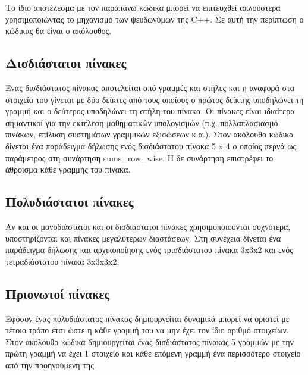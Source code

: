 



Το ίδιο αποτέλεσμα με τον παραπάνω κώδικα μπορεί να επιτευχθεί απλούστερα χρησιμοποιώντας το μηχανισμό των ψευδωνύμων της C++. Σε αυτή την περίπτωση ο κώδικας θα είναι ο ακόλουθος.




\subsection{Δισδιάστατοι πίνακες}
Ένας δισδιάστατος πίνακας αποτελείται από γραμμές και στήλες και η αναφορά στα στοιχεία του γίνεται με δύο  δείκτες από τους οποίους ο πρώτος δείκτης υποδηλώνει τη γραμμή και ο δεύτερος υποδηλώνει τη στήλη του πίνακα. Οι πίνακες είναι ιδιαίτερα σημαντικοί για την εκτέλεση μαθηματικών υπολογισμών (π.χ. πολλαπλασιασμό πινάκων, επίλυση συστημάτων γραμμικών εξισώσεων κ.α.). Στον ακόλουθο κώδικα δίνεται ένα παράδειγμα δήλωσης ενός δισδιάστατου πίνακα 5 x 4 ο οποίος περνά ως παράμετρος στη συνάρτηση sums\_row\_wise. Η δε συνάρτηση επιστρέφει το άθροισμα κάθε γραμμής του πίνακα.






\subsection{Πολυδιάστατοι πίνακες}
Αν και οι μονοδιάστατοι και οι δισδιάστατοι πίνακες χρησιμοποιούνται συχνότερα, υποστηρίζονται και πίνακες μεγαλύτερων διαστάσεων. Στη συνέχεια δίνεται ένα παράδειγμα δήλωσης και αρχικοποίησης ενός τρισδιάστατου πίνακα 3x3x2 και ενός τετραδιάστατου πίνακα 3x3x3x2.




\subsection{Πριονωτοί πίνακες}
Εφόσον ένας πολυδιάστατος πίνακας δημιουργείται δυναμικά μπορεί να οριστεί με τέτοιο τρόπο έτσι ώστε η κάθε γραμμή του να μην έχει τον ίδιο αριθμό στοιχείων. Στον ακόλουθο κώδικα δημιουργείται ένας δισδιάστατος πίνακας 5 γραμμών με την πρώτη γραμμή να έχει 1 στοιχείο και κάθε επόμενη γραμμή ένα περισσότερο στοιχείο από την προηγούμενη της.

